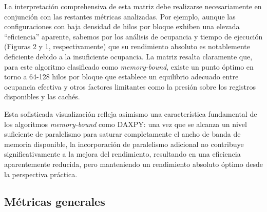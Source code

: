         La interpretación comprehensiva de esta matriz debe realizarse necesariamente en conjunción con las restantes métricas analizadas. Por ejemplo, aunque las configuraciones con baja densidad de hilos por bloque exhiben una elevada ``eficiencia'' aparente, sabemos por los análisis de ocupancia y tiempo de ejecución (Figuras 2 y 1, respectivamente) que su rendimiento absoluto es notablemente deficiente debido a la insuficiente ocupancia. La matriz resalta claramente que, para este algoritmo clasificado como \textit{memory-bound}, existe un punto óptimo en torno a 64-128 hilos por bloque que establece un equilibrio adecuado entre ocupancia efectiva y otros factores limitantes como la presión sobre los registros disponibles y las cachés.

        Esta sofisticada visualización refleja asimismo una característica fundamental de los algoritmos \textit{ memory-bound} como DAXPY: una vez que se alcanza un nivel suficiente de paralelismo para saturar completamente el ancho de banda de memoria disponible, la incorporación de paralelismo adicional no contribuye significativamente a la mejora del rendimiento, resultando en una eficiencia aparentemente reducida, pero manteniendo un rendimiento absoluto óptimo desde la perspectiva práctica.

    \subsection{Métricas generales}

